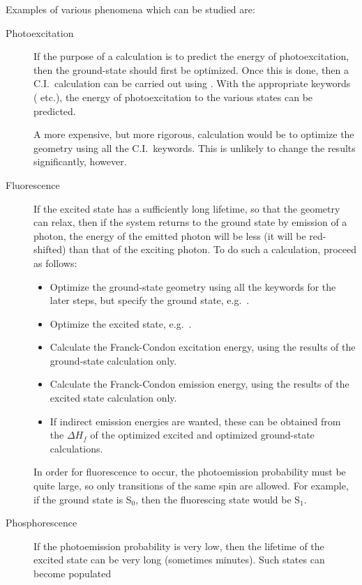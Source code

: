 Examples of various phenomena which can be studied are:
\begin{description}
\item[Photoexcitation]
If the purpose of a calculation is to predict the energy of photoexcitation,
then the ground-state should first be optimized.  Once this is done, then a
C.I.\ calculation can be carried out using .  With the appropriate
keywords ( etc.), the energy of photoexcitation to the
various states can be predicted.

A more expensive, but more rigorous, calculation would be to optimize the
geometry using all the C.I.\ keywords.  This is unlikely to change the results
significantly, however.

\item[Fluorescence]
If the excited state has a sufficiently long lifetime, so that the geometry
can relax, then if the system returns to the ground state by emission of
a photon, the energy of the emitted photon will be less (it will be red-shifted) than
that of the exciting photon.  To do such a calculation, proceed as follows:
\begin{itemize}
\item Optimize the ground-state geometry using all the keywords for the
later steps, but specify the ground state, e.g.\ .
\item Optimize the excited state, e.g.\ .
\item Calculate the Franck-Condon excitation energy, using the results of the
ground-state calculation only.
\item Calculate the Franck-Condon emission energy, using the results of the
excited state calculation only.
\item If indirect emission energies are wanted, these can be obtained from
the $\Delta H_f$ of the optimized excited and optimized ground-state calculations.
\end{itemize}
In order for fluorescence to occur, the photoemission probability must be quite
large, so only transitions of the same spin are allowed.  For example, if the
ground state is S$_0$, then the fluorescing state would be S$_1$.
\item[Phosphorescence]
If the photoemission probability is very low, then the lifetime of the excited
state can be very long (sometimes minutes).  Such states can become populated

\end{description}

